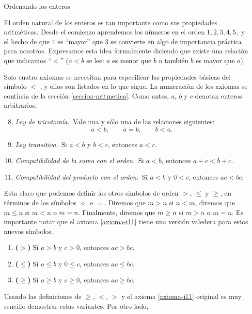 \begin{section}{Ordenando los enteros}\label{seccion-ordenando-los-enteros}

El orden natural de los enteros es tan importante como sus propiedades aritméticas. Desde el comienzo aprendemos los números en el orden $1, 2, 3, 4, 5,$ y el hecho de que $4$ es ``mayor'' que $3$ se convierte en algo de importancia práctica para nosotros. Expresamos esta idea formalmente diciendo que existe una relación que indicamos ``$<$'' ($a < b$ se lee: $a$ es menor que $b$ o también $b$ es mayor que $a$). 

Solo cuatro axiomas se necesitan para especificar las propiedades básicas del símbolo $<$ , y ellos son listados en lo que sigue. La numeración de los axiomas se continúa de la sección \ref{seccion-aritmetica}. Como antes, $a$, $b$ y $c$ denotan enteros arbitrarios.

\begin{enumerate}[label=\textbf{I\arabic*)}, ref=\textbf{I\arabic*}]
    \setcounter{enumi}{7}
    \item \label{axioma-i8} {\em Ley de tricotomía.}\, Vale una y sólo una de las relaciones
siguientes:
$$
a<b, \qquad a = b, \qquad b < a.
$$
\item \label{axioma-i9} {\em Ley transitiva.}\, Si $a< b$ y $b < c$, entonces $a<c$.
\item \label{axioma-i10} {\em Compatibilidad de la suma con el orden.}\, Si $a < b$, entonces $a+c < b+c$. 
\item \label{axioma-i11} {\em Compatibilidad del producto con el orden.}\, Si $a< b$ y $0< c$, entonces $ac < bc$. 
\end{enumerate}


Esta claro que podemos definir los otros símbolos de orden $>$, $\le$ y $\ge$, en términos de los símbolos $<$ e $=$. Diremos que $m>n$ si  $n<m$, diremos que $m \le n$ si $m<n$ o $m=n$. Finalmente, diremos que $m \ge n$ si $m > n$ o $m=n$.  Es importante notar que el  axioma \ref{axioma-i11} tiene una versión valedera para estos nuevos símbolos.
\begin{enumerate}[label=\textit{\alph*)}]
\item \textbf{($>$)} Si $a > b$ y $c>0$, entonces $ac > bc$.
\item \textbf{($\le$)} Si $a \le b$ y $0 \le c$, entonces $ac \le bc$.
\item \textbf{($\ge$)} Si $a\ge b$ y $c\ge 0$, entonces $ac \ge bc$.
\end{enumerate}
Usando las definiciones de $\ge$, $<$, $>$ y el axioma \ref{axioma-i11} original es muy sencillo demostrar estas variantes. Por otro lado,


\end{section}
